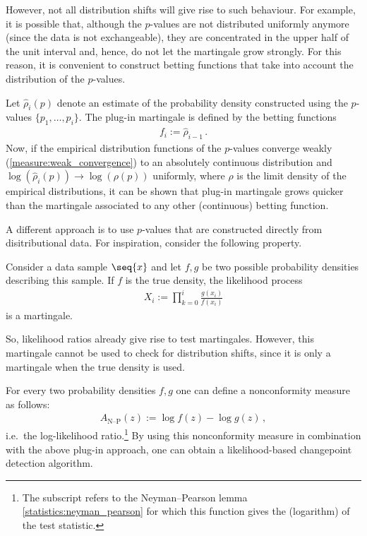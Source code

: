     However, not all distribution shifts will give rise to such behaviour. For example, it is possible that, although the $p$-values are not distributed uniformly anymore (since the data is not exchangeable), they are concentrated in the upper half of the unit interval and, hence, do not let the martingale grow strongly. For this reason, it is convenient to construct betting functions that take into account the distribution of the $p$-values.
    \begin{method}
        Let $\widehat{\rho}_i(p)$ denote an estimate of the probability density constructed using the $p$-values $\{p_1,\ldots,p_i\}$. The plug-in martingale is defined by the betting functions
        \begin{gather}
            f_i := \widehat{\rho}_{i-1}\,.
        \end{gather}
        Now, if the empirical distribution functions of the $p$-values converge weakly (\cref{measure:weak_convergence}) to an absolutely continuous distribution and $\log(\widehat{\rho}_i(p))\longrightarrow\log(\rho(p))$ uniformly, where $\rho$ is the limit density of the empirical distributions, it can be shown that plug-in martingale grows quicker than the martingale associated to any other (continuous) betting function.
    \end{method}

    A different approach is to use $p$-values that are constructed directly from disitributional data. For inspiration, consider the following property.
    \begin{property}
        Consider a data sample $\seq{x}$ and let $f,g$ be two possible probability densities describing this sample. If $f$ is the true density, the likelihood process
        \begin{gather}
            X_i := \prod_{k=0}^i \frac{g(x_i)}{f(x_i)}
        \end{gather}
        is a martingale.
    \end{property}

    So, likelihood ratios already give rise to test martingales. However, this martingale cannot be used to check for distribution shifts, since it is only a martingale when the true density is used.
    \begin{example}
        For every two probability densities $f,g$ one can define a nonconformity measure as follows:
        \begin{gather}
            A_{\text{N--P}}(z) := \log f(z)-\log g(z)\,,
        \end{gather}
        i.e.~the log-likelihood ratio.\footnote{The subscript refers to the Neyman--Pearson lemma \ref{statistics:neyman_pearson} for which this function gives the (logarithm) of the test statistic.} By using this nonconformity measure in combination with the above plug-in approach, one can obtain a likelihood-based changepoint detection algorithm.
    \end{example}

